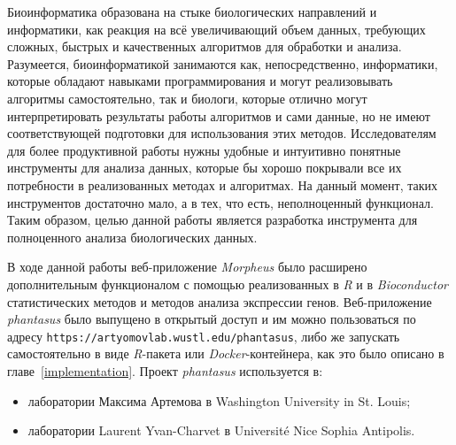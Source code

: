 \documentclass[annotation,specification]{itmo-student-thesis}
\begin{document}



\tableofcontents

\startprefacepage
Биоинформатика образована на стыке биологических направлений и информатики, как реакция на всё увеличивающий объем данных, требующих сложных, быстрых и качественных алгоритмов для обработки и анализа. Разумеется, биоинформатикой занимаются как, непосредственно, информатики, которые обладают навыками программирования и могут реализовывать алгоритмы самостоятельно, так и биологи, которые отлично могут интерпретировать результаты работы алгоритмов и сами данные, но не имеют соответствующей подготовки для использования этих методов. Исследователям для более продуктивной работы нужны удобные и интуитивно понятные инструменты для анализа данных, которые бы хорошо покрывали все их потребности в реализованных методах и алгоритмах. На данный момент, таких инструментов достаточно мало, а в тех, что есть, неполноценный функционал. Таким образом, целью данной работы является разработка инструмента для полноценного анализа биологических данных. 






\startconclusionpage
В ходе данной работы веб-приложение \emph{Morpheus} было расширено дополнительным функционалом с помощью реализованных в \emph{R} и в \emph{Bioconductor} статистических методов и методов анализа экспрессии генов. Веб-приложение \emph{phantasus} было выпущено в открытый доступ и им можно пользоваться по адресу \texttt{https://artyomovlab.wustl.edu/phantasus}, либо же запускать самостоятельно в виде \emph{R}-пакета или \emph{Docker}-контейнера, как это было описано в главе~\ref{implementation}.
Проект \emph{phantasus} используется в:\begin{itemize}
\item лаборатории Максима Артемова в Washington University in St. Louis;
\item лаборатории Laurent Yvan-Charvet в Universit\'e Nice Sophia Antipolis.
\end{itemize}
\end{document}
